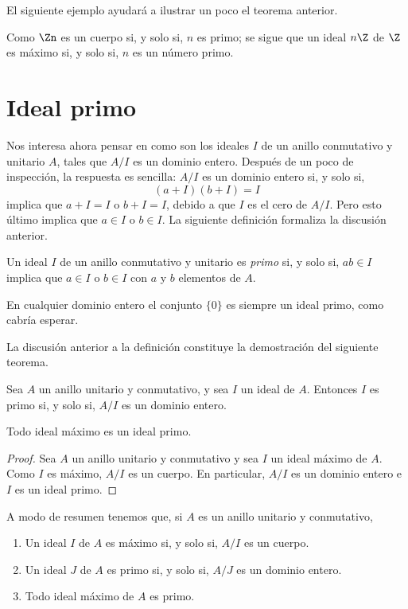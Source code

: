 El siguiente ejemplo ayudará a ilustrar un poco el teorema anterior.

\begin{ejem}
	Como $\Zn$ es un cuerpo si, y solo si, $n$ es primo; se sigue que un ideal $n\Z$ de $\Z$ es máximo si, y solo si, $n$ es un número primo.
\end{ejem}

\section{Ideal primo}

Nos interesa ahora pensar en como son los ideales $I$ de un anillo conmutativo y unitario $A$, tales que $A/I$ es un dominio entero. Después de un poco de inspección, la respuesta es sencilla: $A/I$ es un dominio entero si, y solo si,
\[ (a+I)(b+I) = I \]
implica que $a+I = I$ o $b+I = I$, debido a que $I$ es el cero de $A/I$. Pero esto último implica que $a\in I$ o $b\in I$. La siguiente definición formaliza la discusión anterior.

\begin{defi}
	Un ideal $I$ de un anillo conmutativo y unitario es \textit{primo} si, y solo si, $ab\in I$ implica que $a\in I$ o $b\in I$ con $a$ y $b$ elementos de $A$.
\end{defi}

\begin{nota}
	En cualquier dominio entero el conjunto $\{0\}$ es siempre un ideal primo, como cabría esperar.
\end{nota}

La discusión anterior a la definición constituye la demostración del siguiente teorema.
\begin{teo}
	Sea $A$ un anillo unitario y conmutativo, y sea $I$ un ideal de $A$. Entonces $I$ es primo si, y solo si, $A/I$ es un dominio entero.
\end{teo}
\begin{cor}
	Todo ideal máximo es un ideal primo.
\end{cor}
\begin{proof}
	Sea $A$ un anillo unitario y conmutativo y sea $I$ un ideal máximo de $A$. Como $I$ es máximo, $A/I$ es un cuerpo. En particular, $A/I$ es un dominio entero e $I$ es un ideal primo.
\end{proof}

A modo de resumen tenemos que, si $A$ es un anillo unitario y conmutativo,
\begin{enumerate}
	\item Un ideal $I$ de $A$ es máximo si, y solo si, $A/I$ es un cuerpo.
	\item Un ideal $J$ de $A$ es primo si, y solo si, $A/J$ es un dominio entero.
	\item Todo ideal máximo de $A$ es primo.
\end{enumerate}



